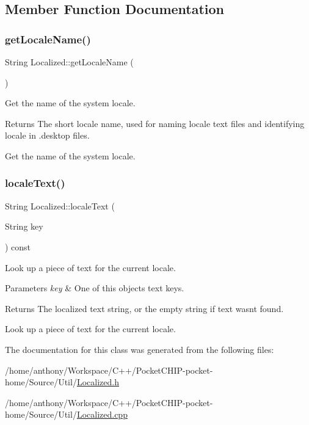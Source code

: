 \subsection{Member Function Documentation}
\mbox{\label{classLocalized_a5e33dd0e653b9690132d6a477f68a82d}} 
\subsubsection{\texorpdfstring{get\+Locale\+Name()}{getLocaleName()}}
{\footnotesize\ttfamily String Localized\+::get\+Locale\+Name (\begin{DoxyParamCaption}{ }\end{DoxyParamCaption})\hspace{0.3cm}{\ttfamily [static]}}

Get the name of the system locale.

\begin{DoxyReturn}{Returns}
The short locale name, used for naming locale text files and identifying locale in .desktop files.
\end{DoxyReturn}
Get the name of the system locale. \mbox{\label{classLocalized_af3fe075aabb4a99fbb99d78bd157acf3}} 
\subsubsection{\texorpdfstring{locale\+Text()}{localeText()}}
{\footnotesize\ttfamily String Localized\+::locale\+Text (\begin{DoxyParamCaption}\item[{String}]{key }\end{DoxyParamCaption}) const}

Look up a piece of text for the current locale.


\begin{DoxyParams}{Parameters}
{\em key} & One of this object\textquotesingle{}s text keys.\\
\hline
\end{DoxyParams}
\begin{DoxyReturn}{Returns}
The localized text string, or the empty string if text wasn\textquotesingle{}t found.
\end{DoxyReturn}
Look up a piece of text for the current locale. 

The documentation for this class was generated from the following files\+:\begin{DoxyCompactItemize}
\item 
/home/anthony/\+Workspace/\+C++/\+Pocket\+C\+H\+I\+P-\/pocket-\/home/\+Source/\+Util/\mbox{\hyperlink{Localized_8h}{Localized.\+h}}\item 
/home/anthony/\+Workspace/\+C++/\+Pocket\+C\+H\+I\+P-\/pocket-\/home/\+Source/\+Util/\mbox{\hyperlink{Localized_8cpp}{Localized.\+cpp}}\end{DoxyCompactItemize}
